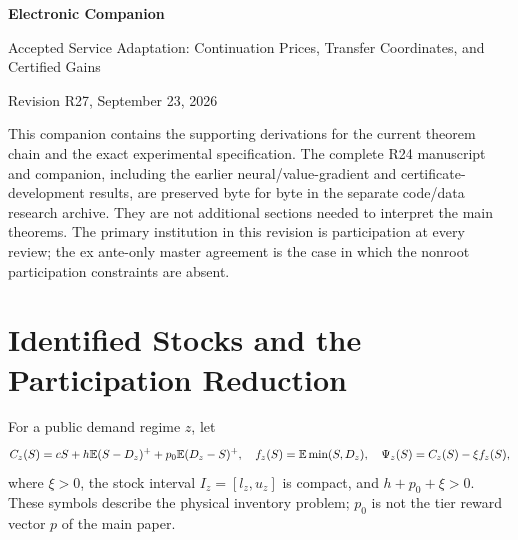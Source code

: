 \documentclass[11pt,letterpaper]{article}
\theoremstyle{definition}\newtheorem{remark}[theorem]{Remark}
\begin{document}
\begin{center}{\Large\bfseries Electronic Companion}\par\vspace{.12in}
Accepted Service Adaptation: Continuation Prices, Transfer Coordinates, and Certified Gains\par
Revision R27, September 23, 2026\end{center}
This companion contains the supporting derivations for the current theorem chain and the exact experimental specification. The complete R24 manuscript and companion, including the earlier neural/value-gradient and certificate-development results, are preserved byte for byte in the separate code/data research archive. They are not additional sections needed to interpret the main theorems. The primary institution in this revision is participation at every review; the ex ante-only master agreement is the case in which the nonroot participation constraints are absent.

\section{Identified Stocks and the Participation Reduction}\label{ec:stock}
For a public demand regime $z$, let
\[
 C_z(S)=cS+h\mathbb E(S-D_z)^++p_0\mathbb E(D_z-S)^+,\quad
 f_z(S)=\mathbb E\min(S,D_z),\quad \Psi_z(S)=C_z(S)-\xi f_z(S),
\]
where $\xi>0$, the stock interval $I_z=[l_z,u_z]$ is compact, and $h+p_0+\xi>0$. These symbols describe the physical inventory problem; $p_0$ is not the tier reward vector $p$ of the main paper.
\end{document}
